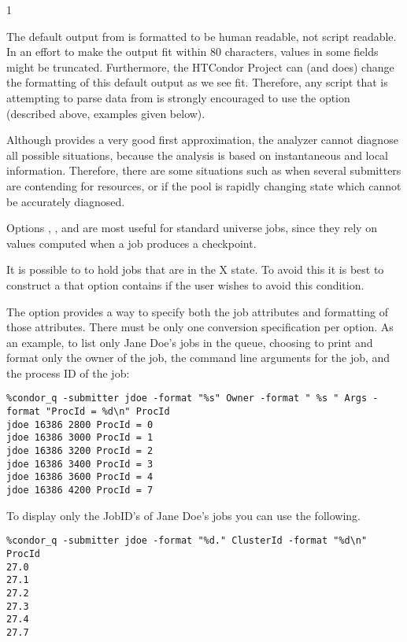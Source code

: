 \begin{ManPage}{\label{man-condor-q}}{1}
\GenRem

The default output from  is formatted to be human readable,
not script readable.
In an effort to make the output fit within 80 characters, values in
some fields might be truncated.
Furthermore, the HTCondor Project can (and does) change the formatting
of this default output as we see fit.
Therefore, any script that is attempting to parse data from 
is strongly encouraged to use the  option (described
above, examples given below).

Although  provides a very good first approximation, the analyzer 
cannot diagnose all possible situations,
because the analysis is based on 
instantaneous and local information.  Therefore, there are some situations 
such as when several submitters are contending for resources, or if the pool 
is rapidly changing state which cannot be accurately diagnosed.

Options
, , and  are most useful for standard
universe jobs, since they rely on values computed when a job
produces a checkpoint.

It is possible to to hold jobs that are in the X state.
To avoid this it 
is best to construct a  that option contains
 if the user wishes to avoid this condition. 

\Examples

The  option provides a way to specify both the job attributes
and formatting of those attributes.
There must be only one conversion specification per  option.
As an example, to list only Jane Doe's jobs in the queue,
choosing to print and format only the owner of the job,
the command line arguments for the job, and the
process ID of the job:
\footnotesize
\begin{verbatim}
%condor_q -submitter jdoe -format "%s" Owner -format " %s " Args -format "ProcId = %d\n" ProcId
jdoe 16386 2800 ProcId = 0
jdoe 16386 3000 ProcId = 1
jdoe 16386 3200 ProcId = 2
jdoe 16386 3400 ProcId = 3
jdoe 16386 3600 ProcId = 4
jdoe 16386 4200 ProcId = 7
\end{verbatim}
\normalsize

To display only the JobID's of Jane Doe's jobs you can use the following.
\footnotesize
\begin{verbatim}
%condor_q -submitter jdoe -format "%d." ClusterId -format "%d\n" ProcId
27.0
27.1
27.2
27.3
27.4
27.7
\end{verbatim}
\normalsize


\end{ManPage}
